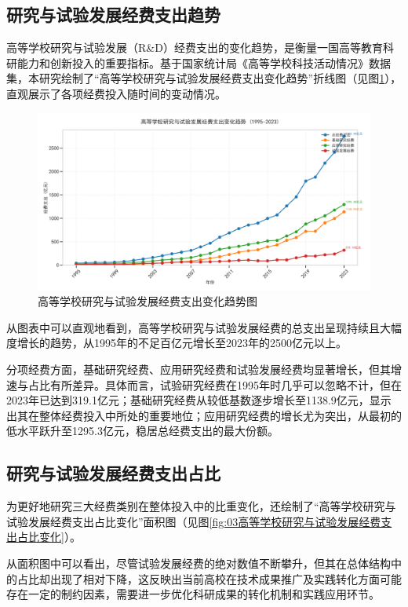 \subsection{研究与试验发展经费支出趋势}
高等学校研究与试验发展（R\&D）经费支出的变化趋势，是衡量一国高等教育科研能力和创新投入的重要指标。基于国家统计局《高等学校科技活动情况》数据集，本研究绘制了“高等学校研究与试验发展经费支出变化趋势”折线图（见图\ref{fig:02高等学校研究与试验发展经费支出变化趋势图}），直观展示了各项经费投入随时间的变动情况。

\begin{figure}[H]
    \centering
    \includegraphics[width=0.8\linewidth]{figure/02高等学校研究与试验发展经费支出变化趋势图.png}
    \caption{高等学校研究与试验发展经费支出变化趋势图}
    \label{fig:02高等学校研究与试验发展经费支出变化趋势图}
\end{figure}

从图表中可以直观地看到，高等学校研究与试验发展经费的总支出呈现持续且大幅度增长的趋势\cite{Zhou2024}，从1995年的不足百亿元增长至2023年的2500亿元以上。

分项经费方面，基础研究经费、应用研究经费和试验发展经费均显著增长，但其增速与占比有所差异。具体而言，试验研究经费在1995年时几乎可以忽略不计，但在2023年已达到319.1亿元；基础研究经费从较低基数逐步增长至1138.9亿元，显示出其在整体经费投入中所处的重要地位；应用研究经费的增长尤为突出，从最初的低水平跃升至1295.3亿元，稳居总经费支出的最大份额。

\subsection{研究与试验发展经费支出占比}
为更好地研究三大经费类别在整体投入中的比重变化，还绘制了“高等学校研究与试验发展经费支出占比变化”面积图（见图\ref{fig:03高等学校研究与试验发展经费支出占比变化}）。

从面积图中可以看出，尽管试验发展经费的绝对数值不断攀升，但其在总体结构中的占比却出现了相对下降，这反映出当前高校在技术成果推广及实践转化方面可能存在一定的制约因素，需要进一步优化科研成果的转化机制和实践应用环节。

